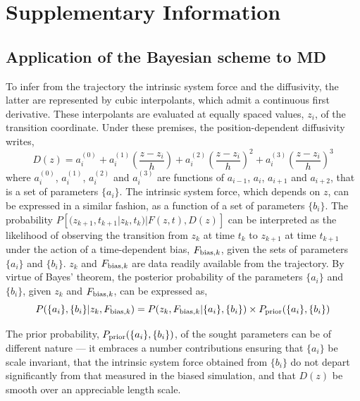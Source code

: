
\section{Supplementary Information}
\subsection{Application of the Bayesian scheme to MD}
  \par To infer from the trajectory the intrinsic system force and the diffusivity, the latter are represented by cubic interpolants, which admit a continuous first derivative. These interpolants are evaluated at equally spaced values, $z_i$, of the transition coordinate. Under these premises, the position-dependent diffusivity writes,
%
\begin{equation}
D(z) = a_i^{(0)} + a_i^{(1)} \left(\frac{z-z_i}{h}\right) + a_i^{(2)} \left(\frac{z-z_i}{h}\right)^2 + a_i^{(3)} \left(\frac{z-z_i}{h}\right)^3
\end{equation}
%
  where $a_i^{(0)}$, $a_i^{(1)}$, $a_i^{(2)}$ and $a_i^{(3)}$ are functions of $a_{i-1}$, $a_i$, $a_{i+1}$ and $a_{i+2}$, that is a set of parameters $\{ a_i \}$. The intrinsic system force, which depends on $z$, can be expressed in a similar fashion, as a function of a set of parameters $\{ b_i \}$. The probability $P[(z_{k+1}, t_{k+1} | z_k, t_k) | F(z,t), D(z)]$ can be interpreted as the likelihood of observing the transition from $z_k$ at time $t_k$ to $z_{k+1}$ at time $t_{k+1}$ under the action of a time-dependent bias, $F_{{\rm bias}, k}$, given the sets of parameters $\{ a_i \}$ and $\{ b_i \}$. $z_k$ and $F_{{\rm bias}, k}$ are data readily available from the trajectory. By virtue of Bayes' theorem, the posterior probability of the parameters $\{ a_i \}$ and $\{ b_i \}$, given $z_k$ and $F_{{\rm bias}, k}$, can be expressed as,
%
\begin{equation}
\label{Bayes}
P(\{ a_i \}, \{ b_i \} | z_k, F_{{\rm bias}, k}) =
P(z_k, F_{{\rm bias}, k} | \{ a_i \}, \{ b_i \}) \times P_{\rm prior}(\{ a_i \}, \{ b_i \})
\end{equation}
%
  \par The prior probability, $P_{\rm prior}(\{ a_i \}, \{ b_i \})$, of the sought parameters can be of different nature --- it embraces a number contributions ensuring that $\{ a_i \}$ be scale invariant, that the intrinsic system force obtained from $\{ b_i \}$ do not depart significantly from that measured in the biased simulation, and that $D(z)$ be smooth over an appreciable length scale.

